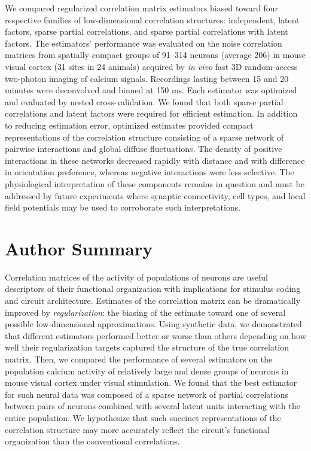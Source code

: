 \documentclass[10pt]{article}
\begin{document}
We compared regularized correlation matrix estimators biased toward four respective families of low-dimensional correlation structures: independent, latent factors, sparse partial correlations, and sparse partial correlations with latent factors.  The estimators' performance was evaluated on the noise correlation matrices from spatially compact groups of 91--314 neurons (average 206) in mouse visual cortex (31 sites in 24 animals) acquired by \emph{in vivo} fast 3D random-access two-photon imaging of calcium signals.  Recordings lasting between 15 and 20 minutes were deconvolved and binned at 150 ms.  Each estimator was optimized and evaluated by nested cross-validation.  We found that both sparse partial correlations and latent factors were required for efficient estimation.  In addition to reducing estimation error, optimized estimates provided compact representations of the correlation structure consisting of a sparse network of pairwise interactions and global diffuse fluctuations.  The density of positive interactions in these networks decreased rapidly with distance and with difference in orientation preference, whereas negative interactions were less selective.  The physiological interpretation of these components remains in question and must be addressed by future experiments where synaptic connectivity, cell types, and local field potentials may be used to corroborate such interpretations.

\section*{Author Summary}
Correlation matrices of the activity of populations of neurons are useful descriptors of their functional organization with implications for stimulus coding and circuit architecture.  Estimates of the correlation matrix can be dramatically improved by \emph{regularization}: the biasing of the estimate toward one of several possible low-dimensional approximations.  Using synthetic data, we demonstrated that different estimators performed better or worse than others depending on how well their regularization targets captured the structure of the true correlation matrix.  Then, we compared the performance of several estimators on the population calcium activity of relatively large and dense groups of neurons in mouse visual cortex under visual stimulation.  We found that the best estimator for such neural data was composed of a sparse network of partial correlations between pairs of neurons combined with several latent units interacting with the entire population. We hypothesize that such succinct representations of the correlation structure may more accurately reflect the circuit's functional organization than the conventional correlations.  
\end{document}
